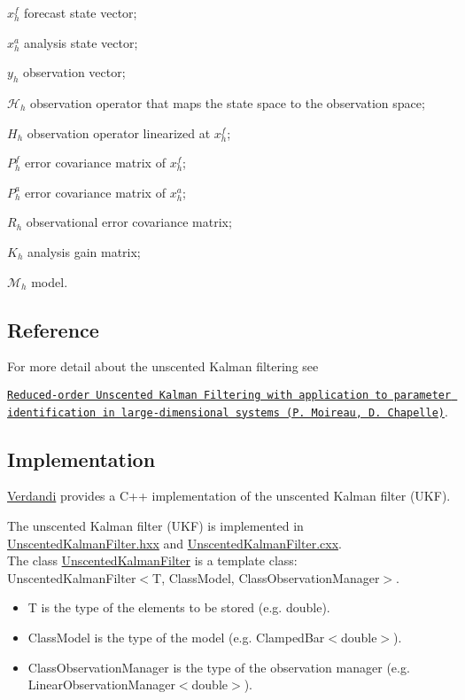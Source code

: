 \documentclass{tufte-book}
\begin{document}
 $x_h^f$ forecast state vector; \par
 $x_h^a$ analysis state vector; \par
 $y_h$ observation vector; \par
 $\mathcal{H}_h$ observation operator that maps the state space to the observation space; \par
 $H_h$ observation operator linearized at $x^f_h$; \par
 $P^f_h$ error covariance matrix of $x_h^f$; \par
 $P^a_h$ error covariance matrix of $x_h^a$; \par
 $R_h$ observational error covariance matrix; \par
 $K_h$ analysis gain matrix; \par
 $\mathcal{M}_h$ model.

 \hypertarget{unscented_kalman_filter_ukf_ref}{}\subsection{\-Reference}\label{unscented_kalman_filter_ukf_ref}
\-For more detail about the unscented \-Kalman filtering see\par
 \href{http://dx.doi.org/10.1051/cocv/2010006}{\tt \-Reduced-\/order \-Unscented \-Kalman \-Filtering with application to parameter identification in large-\/dimensional systems (\-P. \-Moireau, \-D. \-Chapelle)}.


 \hypertarget{unscented_kalman_filter_ukf_implementation}{}\subsection{\-Implementation}\label{unscented_kalman_filter_ukf_implementation}


 \hyperlink{namespace_verdandi}{\-Verdandi} provides a \-C++ implementation of the unscented \-Kalman filter (\-U\-K\-F).

\-The unscented \-Kalman filter (\-U\-K\-F) is implemented in {\ttfamily \hyperlink{_unscented_kalman_filter_8hxx_source}{\-Unscented\-Kalman\-Filter.\-hxx}} and {\ttfamily \hyperlink{_unscented_kalman_filter_8cxx_source}{\-Unscented\-Kalman\-Filter.\-cxx}}.\\
 \-The class {\ttfamily  \hyperlink{class_verdandi_1_1_unscented_kalman_filter}{\-Unscented\-Kalman\-Filter}} is a template class\-:\\
  {\ttfamily \-Unscented\-Kalman\-Filter$<$\-T, Class\-Model, Class\-Observation\-Manager$>$}.
  \begin{itemize}
  \item {\ttfamily \-T} is the type of the elements to be stored (e.\-g. {\ttfamily double}).
  \item {\ttfamily \-Class\-Model} is the type of the model (e.\-g. {\ttfamily \-Clamped\-Bar$<$double$>$}).
  \item {\ttfamily \-Class\-Observation\-Manager} is the type of the observation manager (e.\-g. {\ttfamily \-Linear\-Observation\-Manager$<$double$>$}).
\end{itemize}
\end{document}
